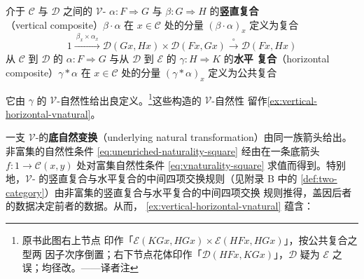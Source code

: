 \begin{definition}\label{def:vertical-horizontal-composites}
介于 $\mathcal{C}$ 与 $\mathcal{D}$ 之间的 $\mathcal{V}$-\trNaturalTransformation
$\alpha\colon F\Rightarrow G$ 与 $\beta\colon G\Rightarrow H$ 的\textbf{竖直复合}
（vertical composite）$\beta\cdot\alpha$ 在 $x\in\mathcal{C}$ 处的分量
$(\beta\cdot\alpha)_{x}$ 定义为复合
\[ 1\xrightarrow{\ \beta_{x}\times\alpha_{x}\ }
   \mathcal{D}(Gx,Hx)\times\mathcal{D}(Fx,Gx)
   \xrightarrow{\ \circ\ }\mathcal{D}(Fx,Hx) \]
从 $\mathcal{C}$ 到 $\mathcal{D}$ 的 $\alpha\colon F\Rightarrow G$ 与从
$\mathcal{D}$ 到 $\mathcal{E}$ 的 $\gamma\colon H\Rightarrow K$ 的\textbf{水平
复合}（horizontal composite）$\gamma*\alpha$ 在 $x\in\mathcal{C}$ 处的分量
$(\gamma*\alpha)_{x}$ 定义为公共复合
\begin{center}
\end{center}
它由 $\gamma$ 的 $\mathcal{V}$-自然性给出良定义。\footnote{原书此图右上节点
印作「$\mathcal{E}(KGx,HGx)\times\mathcal{E}(HFx,HGx)$」，按公共复合之型两
因子次序倒置；右下节点花体印作「$\mathcal{D}(HFx,KGx)$」，$\mathcal{D}$ 疑为
$\mathcal{E}$ 之误；均径改。——译者注}这些构造的 $\mathcal{V}$-自然性
留作\cref{ex:vertical-horizontal-vnatural}。
\end{definition}

一支 $\mathcal{V}$-\trNaturalTransformation{}的\textbf{底自然变换}（underlying
natural transformation）由同一族箭头给出。非富集的自然性条件
\eqref{eq:unenriched-naturality-square} 经由在一条底箭头
$f\colon 1\to\mathcal{C}(x,y)$ 处对富集自然性条件
\eqref{eq:vnaturality-square} 求值而得到。特别地，$\mathcal{V}$-%
\trNaturalTransformation{}的竖直复合与水平复合的中间四项交换规则（见附录 B 中的%
\cref{def:two-category}）由非富集\trNaturalTransformation{}的竖直复合与水平复合的中间四项交换
规则推得，盖因后者的数据决定前者的数据。从而，%
\cref{ex:vertical-horizontal-vnatural} 蕴含：

